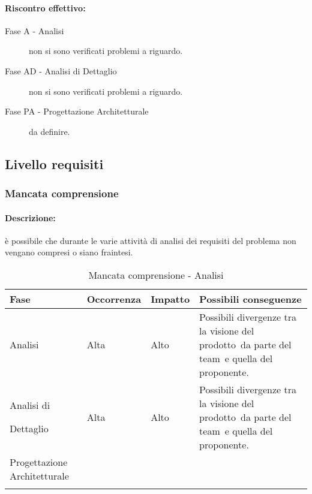 \documentclass[../PianoProgetto.tex]{subfiles}
\begin{document}
	\paragraph*{Riscontro effettivo:}
		\begin{description}
			\item[Fase A - Analisi] non si sono verificati problemi a riguardo.
			\item[Fase AD - Analisi di Dettaglio] non si sono verificati problemi a riguardo.
			\item[Fase PA - Progettazione Architetturale] da definire.
		\end{description}

\newpage
\subsection{Livello requisiti}

\subsubsection{Mancata comprensione}
\label{sec:Mancata comprensione}

	\paragraph*{Descrizione:} è possibile che durante le varie attività di analisi dei requisiti del problema non vengano compresi o siano fraintesi.
	
	
	\begin{table}[h]
		\centering
		\begin{tabularx}{\textwidth}{F O O P}
			\toprule
			\textbf{Fase} & \textbf{Occorrenza} & \textbf{Impatto} & \textbf{Possibili conseguenze}\\
			\midrule
			Analisi & Alta & Alto & Possibili divergenze tra la visione del prodotto\g\ da parte del team\g\ e quella del proponente. \\
			\midrule
			Analisi di \par Dettaglio & Alta & Alto & Possibili divergenze tra la visione del prodotto\g\ da parte del team\g\ e quella del proponente.\\
			\midrule
			Progettazione Architetturale & & & \\
			\bottomrule
		\end{tabularx}
		\caption{Mancata comprensione - Analisi}
		\label{tab:Mancata comprensione - Analisi}	
	\end{table}
		
\end{document}
